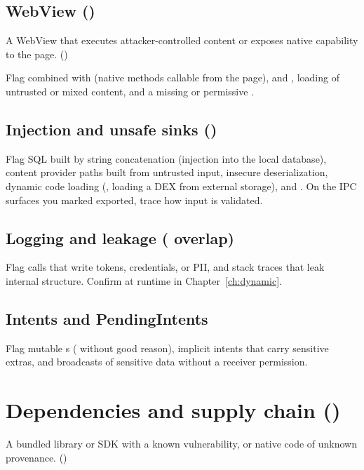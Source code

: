 \subsection{WebView ()}
\begin{findingbox}
A WebView that executes attacker-controlled content or exposes native capability to the page. ()
\end{findingbox}
Flag  combined with  (native methods callable from the page),  and , loading of untrusted or mixed content, and a missing or permissive .

\subsection{Injection and unsafe sinks ()}
Flag SQL built by string concatenation (injection into the local database), content provider  paths built from untrusted input, insecure deserialization, dynamic code loading (, loading a DEX from external storage), and . On the IPC surfaces you marked exported, trace how input is validated.

\subsection{Logging and leakage ( overlap)}
Flag  calls that write tokens, credentials, or PII, and stack traces that leak internal structure. Confirm at runtime in Chapter~\ref{ch:dynamic}.

\subsection{Intents and PendingIntents}
Flag mutable s ( without good reason), implicit intents that carry sensitive extras, and broadcasts of sensitive data without a receiver permission.

\section{Dependencies and supply chain ()}
\begin{findingbox}
A bundled library or SDK with a known vulnerability, or native code of unknown provenance. ()
\end{findingbox}

